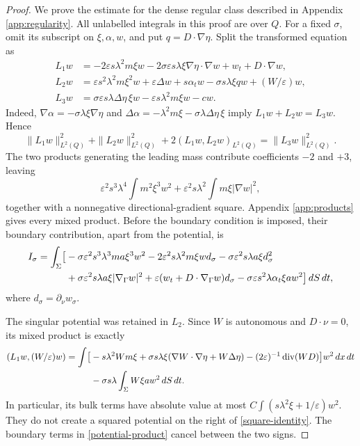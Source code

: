 \documentclass[11pt]{article}
\theoremstyle{remark}
\newcommand{\eps}{\varepsilon}
\newcommand{\divg}{\operatorname{div}}
\newcommand{\dd}{\,dx\,dt}
\newcommand{\ds}{\,dS\,dt}
\begin{document}
\begin{proof}
We prove the estimate for the dense regular class described in Appendix
\ref{app:regularity}. All unlabelled integrals in this proof are over $Q$.
For a fixed $\sigma$, omit its subscript on $\xi,\alpha,w$, and put
$q=D\cdot\nabla\eta$. Split the transformed equation as
\begin{align}
 L_1w&=-2\eps s\lambda^2m\xi w
       -2\sigma\eps s\lambda\xi\nabla\eta\cdot\nabla w
       +w_t+D\cdot\nabla w,\label{split1}\\
 L_2w&=\eps s^2\lambda^2m\xi^2w+\eps\Delta w
       +s\alpha_tw-\sigma s\lambda\xi q w+(W/\eps)w,\label{split2}\\
 L_3w&=\sigma\eps s\lambda\Delta\eta\,\xi w
       -\eps s\lambda^2m\xi w-cw.\label{split3}
\end{align}
Indeed, $\nabla\alpha=-\sigma\lambda\xi\nabla\eta$ and
$\Delta\alpha=-\lambda^2m\xi-\sigma\lambda\Delta\eta\,\xi$ imply
$L_1w+L_2w=L_3w$. Hence
\begin{equation}\label{square-identity}
 \|L_1w\|_{L^2(Q)}^2+\|L_2w\|_{L^2(Q)}^2+2(L_1w,L_2w)_{L^2(Q)}
                  =\|L_3w\|_{L^2(Q)}^2.
\end{equation}
The two products generating the leading mass contribute coefficients
$-2$ and $+3$, leaving
\begin{equation}\label{leading}
 \eps^2s^3\lambda^4\int m^2\xi^3w^2
       +\eps^2s\lambda^2\int m\xi|\nabla w|^2,
\end{equation}
together with a nonnegative directional-gradient square. Appendix
\ref{app:products} gives every mixed product. Before the boundary condition
is imposed, their boundary contribution, apart from the potential, is
\begin{align}
 I_\sigma=\int_\Sigma\bigl[&-\sigma\eps^2s^3\lambda^3ma\xi^3w^2
 -2\eps^2s\lambda^2m\xi w d_\sigma
 -\sigma\eps^2s\lambda a\xi d_\sigma^2\notag\\
 &+\sigma\eps^2s\lambda a\xi|\nabla_\Gamma w|^2
 +\eps(w_t+D\cdot\nabla_\Gamma w)d_\sigma
 -\sigma\eps s^2\lambda\alpha_t\xi a w^2\bigr]\ds,
 \label{boundary-unsummed}
\end{align}
where $d_\sigma=\partial_\nu w_\sigma$.

The singular potential was retained in $L_2$. Since $W$ is autonomous and
$D\cdot\nu=0$, its mixed product is exactly
\begin{align}
 (L_1w,(W/\eps)w)=
 \int\bigl[&-s\lambda^2Wm\xi
 +\sigma s\lambda\xi(\nabla W\cdot\nabla\eta+W\Delta\eta)
 -(2\eps)^{-1}\divg(WD)\bigr]w^2\dd\notag\\
 &-\sigma s\lambda\int_\Sigma W\xi a w^2\ds.
 \label{potential-product}
\end{align}
In particular, its bulk terms have absolute value at most
$C\int(s\lambda^2\xi+1/\eps)w^2$. They do not create a squared potential
on the right of \eqref{square-identity}. The boundary terms in
\eqref{potential-product} cancel between the two signs.


\end{proof}
\end{document}
